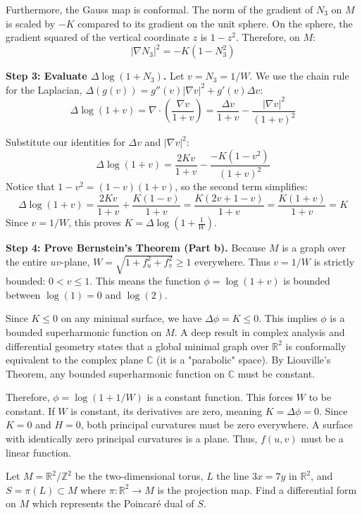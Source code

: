 \begin{solution}
Furthermore, the Gauss map is conformal. The norm of the gradient of $N_3$ on $M$ is scaled by $-K$ compared to its gradient on the unit sphere. On the sphere, the gradient squared of the vertical coordinate $z$ is $1 - z^2$. Therefore, on $M$:
\[ |\nabla N_3|^2 = -K(1 - N_3^2) \]

\textbf{Step 3: Evaluate $\Delta \log(1 + N_3)$.}
Let $v = N_3 = 1/W$. We use the chain rule for the Laplacian, $\Delta(g(v)) = g''(v)|\nabla v|^2 + g'(v)\Delta v$:
\[ \Delta \log(1+v) = \nabla \cdot \left( \frac{\nabla v}{1+v} \right) = \frac{\Delta v}{1+v} - \frac{|\nabla v|^2}{(1+v)^2} \]

Substitute our identities for $\Delta v$ and $|\nabla v|^2$:
\[ \Delta \log(1+v) = \frac{2K v}{1+v} - \frac{-K(1 - v^2)}{(1+v)^2} \]
Notice that $1 - v^2 = (1-v)(1+v)$, so the second term simplifies:
\[ \Delta \log(1+v) = \frac{2K v}{1+v} + \frac{K(1-v)}{1+v} = \frac{K(2v + 1 - v)}{1+v} = \frac{K(1+v)}{1+v} = K \]
Since $v = 1/W$, this proves $K = \Delta \log\!\left(1 + \frac{1}{W}\right)$.

\textbf{Step 4: Prove Bernstein's Theorem (Part b).}
Because $M$ is a graph over the entire $uv$-plane, $W = \sqrt{1 + f_u^2 + f_v^2} \ge 1$ everywhere. Thus $v = 1/W$ is strictly bounded: $0 < v \le 1$.
This means the function $\phi = \log(1+v)$ is bounded between $\log(1) = 0$ and $\log(2)$.

Since $K \le 0$ on any minimal surface, we have $\Delta \phi = K \le 0$. This implies $\phi$ is a bounded superharmonic function on $M$.
A deep result in complex analysis and differential geometry states that a global minimal graph over $\mathbb{R}^2$ is conformally equivalent to the complex plane $\mathbb{C}$ (it is a "parabolic" space). 
By Liouville's Theorem, any bounded superharmonic function on $\mathbb{C}$ must be constant.

Therefore, $\phi = \log(1+1/W)$ is a constant function. This forces $W$ to be constant.
If $W$ is constant, its derivatives are zero, meaning $K = \Delta \phi = 0$.
Since $K = 0$ and $H = 0$, both principal curvatures must be zero everywhere. A surface with identically zero principal curvatures is a plane. Thus, $f(u, v)$ must be a linear function.
\end{solution}

\begin{exercise}
\label{geometry:2014:3}
Let $M = \mathbb{R}^{2} / \mathbb{Z}^{2}$ be the two-dimensional torus, $L$ the line $3x = 7y$ in $\mathbb{R}^{2}$, and $S = \pi(L) \subset M$ where $\pi : \mathbb{R}^{2} \to M$ is the projection map. Find a differential form on $M$ which represents the Poincaré dual of $S$.
\end{exercise}

